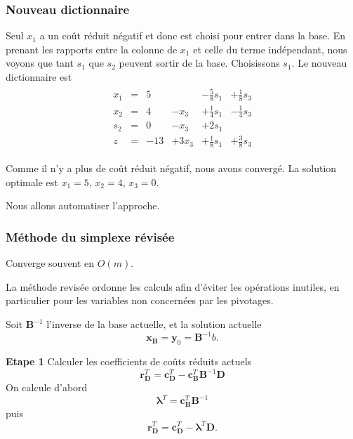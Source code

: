 \documentclass[usepdftitle=false]{beamer}
\def\bc{\boldsymbol{c}}
\def\br{\boldsymbol{r}}
\def\bx{\boldsymbol{x}}
\def\by{\boldsymbol{y}}
\def\bB{\boldsymbol{B}}
\def\bD{\boldsymbol{D}}
\def\blambda{\boldsymbol{\lambda}}
\begin{document}
\begin{frame}
\frametitle{Nouveau dictionnaire}

Seul $x_1$ a un coût réduit négatif et donc est choisi pour entrer dans la base.
En prenant les rapports entre la colonne de $x_1$ et celle du terme indépendant, nous voyons que tant $s_1$ que $s_2$ peuvent sortir de la base. Choisissons $s_1$. Le nouveau dictionnaire est
\begin{align*}
\begin{array}{cccccc}
x_1 & = & 5 & & - \frac{5}{8}s_1 & + \frac{1}{8}s_3 \\
x_2 & = & 4 & - x_3 & + \frac{1}{4}s_1 & - \frac{1}{4}s_3 \\
s_2 & =	& 0 & - x_3 & + 2s_1 &  \\
z & = & -13 & + 3 x_3 & + \frac{1}{8}s_1 & + \frac{3}{8}s_3
\end{array}
\end{align*}

Comme il n'y a plus de coût réduit négatif, nous avons convergé. La solution optimale est $x_1 = 5$, $x_2 = 4$, $x_3 = 0$.

\mbox{}

Nous allons automatiser l'approche.

\end{frame}

\begin{frame}
\frametitle{Méthode du simplexe révisée}

Converge souvent en $O(m)$.

\mbox{}

La méthode revisée ordonne les calculs afin d'éviter les opérations inutiles, en particulier pour les variables non concernées par les pivotages.

\mbox{}

Soit $\bB^{-1}$ l'inverse de la base actuelle, et la solution actuelle
\[
\bx_{\bB} = \by_0 = \bB^{-1}b.
\]

\mbox{}

{\bf Etape 1} Calculer les coefficients de coûts réduits actuels
\[
\br_{\bD}^T = \bc_{\bD}^T - \bc_{\bB}^T \bB^{-1} \bD
\]
On calcule d'abord
\[
\blambda^T = \bc^T_{\bB}\bB^{-1}
\]
puis
\[
\br_{\bD}^T = \bc_{\bD}^T - \blambda^T \bD.
\]
\end{frame}
\end{document}
